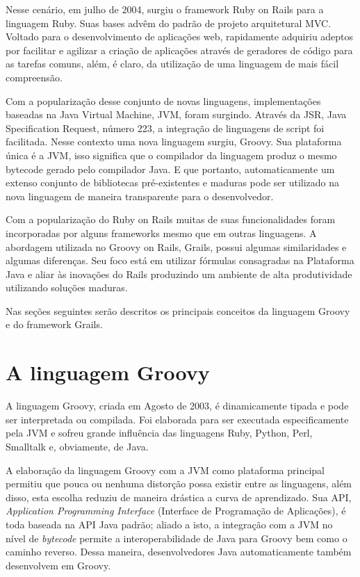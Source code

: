 \documentclass[12pt]{article}
\begin{document}
    Nesse cenário, em julho de 2004, surgiu o framework Ruby on Rails 
    para a linguagem Ruby. Suas bases advêm do padrão de projeto arquitetural MVC. 
    Voltado para o desenvolvimento de aplicações web, rapidamente adquiriu adeptos por 
    facilitar e agilizar a criação de aplicações através de geradores de código 
    para as tarefas comuns, além, é claro, da utilização de uma linguagem de mais 
    fácil compreensão.

    Com a popularização desse conjunto de novas linguagens, implementações 
    baseadas na Java Virtual Machine, JVM, foram surgindo. Através da JSR, Java 
    Specification Request, número 223, a integração de linguagens de script foi 
    facilitada. Nesse contexto uma nova linguagem surgiu, Groovy. Sua plataforma 
    única é a JVM, isso significa que o compilador da linguagem produz o mesmo
    bytecode gerado pelo compilador Java. E que portanto, automaticamente um 
    extenso conjunto de bibliotecas pré-existentes e maduras pode ser utilizado 
    na nova linguagem de maneira transparente para o desenvolvedor. 
    
    Com a popularização do Ruby on Rails muitas de suas funcionalidades foram 
    incorporadas por alguns frameworks mesmo que em outras linguagens. A 
    abordagem utilizada no Groovy on Rails, Grails, possui algumas similaridades 
    e algumas diferenças. Seu foco está em utilizar fórmulas consagradas na 
    Plataforma Java e aliar às inovações do Rails produzindo um ambiente de alta 
    produtividade utilizando soluções maduras.
    
    Nas seções seguintes serão descritos os principais conceitos da linguagem 
    Groovy e do framework Grails.

\section{A linguagem Groovy} \label{sec:linguagem_groovy}

    A linguagem Groovy, criada em  Agosto de 2003, é dinamicamente tipada e pode
    ser interpretada ou compilada. Foi elaborada para ser executada especificamente
    pela JVM e sofreu grande influência das linguagens Ruby, Python, Perl, 
    Smalltalk e, obviamente, de Java.
    
    A elaboração da linguagem Groovy com a JVM como plataforma principal permitiu 
    que pouca ou nenhuma distorção possa existir entre as linguagens, além disso, 
    esta escolha reduziu de maneira drástica a curva de aprendizado. Sua API, 
    \emph{Application Programming Interface} (Interface de Programação de Aplicações), 
    é toda baseada na API Java padrão; aliado a isto, a integração com a JVM no 
    nível de \emph{bytecode} permite a interoperabilidade de Java para Groovy bem como 
    o caminho reverso. Dessa maneira, desenvolvedores Java automaticamente também 
    desenvolvem em Groovy.
    
\end{document}
